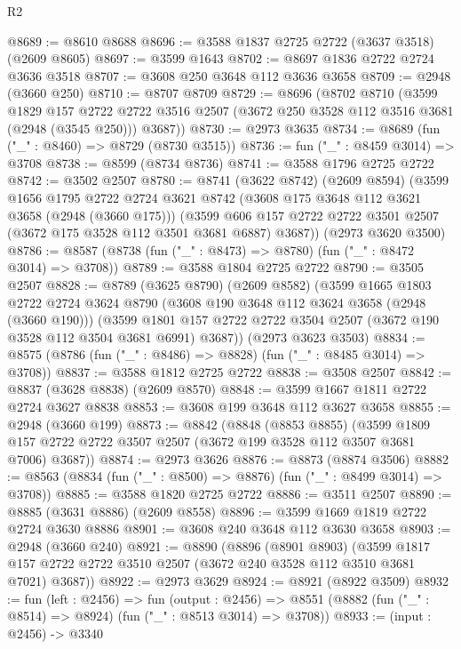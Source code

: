 \begin{lexlean}{R2}
\begin{coremodule}
@8689 := @8610 @8688
@8696 := @3588 @1837 @2725 @2722 (@3637 @3518) (@2609 @8605)
@8697 := @3599 @1643
@8702 := @8697 @1836 @2722 @2724 @3636 @3518
@8707 := @3608 @250 @3648 @112 @3636 @3658
@8709 := @2948 (@3660 @250)
@8710 := @8707 @8709
@8729 := @8696
    (@8702
      @8710
      (@3599
        @1829
        @157
        @2722
        @2722
        @3516
        @2507
        (@3672 @250 @3528 @112 @3516 @3681 (@2948 (@3545 @250)))
        @3687))
@8730 := @2973 @3635
@8734 := @8689 (fun ("_" : @8460) => @8729 (@8730 @3515))
@8736 := fun ("_" : @8459 @3014) => @3708
@8738 := @8599 (@8734 @8736)
@8741 := @3588 @1796 @2725 @2722
@8742 := @3502 @2507
@8780 := @8741
    (@3622 @8742)
    (@2609 @8594)
    (@3599
      @1656
      @1795
      @2722
      @2724
      @3621
      @8742
      (@3608 @175 @3648 @112 @3621 @3658 (@2948 (@3660 @175)))
      (@3599 @606 @157 @2722 @2722 @3501 @2507 (@3672 @175 @3528 @112 @3501 @3681 @6887) @3687))
    (@2973 @3620 @3500)
@8786 := @8587 (@8738 (fun ("_" : @8473) => @8780) (fun ("_" : @8472 @3014) => @3708))
@8789 := @3588 @1804 @2725 @2722
@8790 := @3505 @2507
@8828 := @8789
    (@3625 @8790)
    (@2609 @8582)
    (@3599
      @1665
      @1803
      @2722
      @2724
      @3624
      @8790
      (@3608 @190 @3648 @112 @3624 @3658 (@2948 (@3660 @190)))
      (@3599 @1801 @157 @2722 @2722 @3504 @2507 (@3672 @190 @3528 @112 @3504 @3681 @6991) @3687))
    (@2973 @3623 @3503)
@8834 := @8575 (@8786 (fun ("_" : @8486) => @8828) (fun ("_" : @8485 @3014) => @3708))
@8837 := @3588 @1812 @2725 @2722
@8838 := @3508 @2507
@8842 := @8837 (@3628 @8838) (@2609 @8570)
@8848 := @3599 @1667 @1811 @2722 @2724 @3627 @8838
@8853 := @3608 @199 @3648 @112 @3627 @3658
@8855 := @2948 (@3660 @199)
@8873 := @8842
    (@8848
      (@8853 @8855)
      (@3599 @1809 @157 @2722 @2722 @3507 @2507 (@3672 @199 @3528 @112 @3507 @3681 @7006) @3687))
@8874 := @2973 @3626
@8876 := @8873 (@8874 @3506)
@8882 := @8563 (@8834 (fun ("_" : @8500) => @8876) (fun ("_" : @8499 @3014) => @3708))
@8885 := @3588 @1820 @2725 @2722
@8886 := @3511 @2507
@8890 := @8885 (@3631 @8886) (@2609 @8558)
@8896 := @3599 @1669 @1819 @2722 @2724 @3630 @8886
@8901 := @3608 @240 @3648 @112 @3630 @3658
@8903 := @2948 (@3660 @240)
@8921 := @8890
    (@8896
      (@8901 @8903)
      (@3599 @1817 @157 @2722 @2722 @3510 @2507 (@3672 @240 @3528 @112 @3510 @3681 @7021) @3687))
@8922 := @2973 @3629
@8924 := @8921 (@8922 @3509)
@8932 := fun (left : @2456) =>
  fun (output : @2456) =>
  @8551 (@8882 (fun ("_" : @8514) => @8924) (fun ("_" : @8513 @3014) => @3708))
@8933 := (input : @2456) -> @3340

\end{coremodule}
\end{lexlean}

